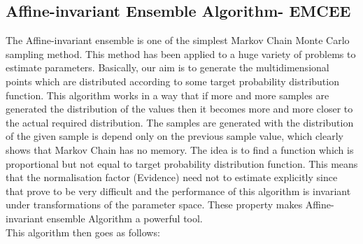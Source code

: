 \documentclass[12pt]{report}
\begin{document}
\subsection{Affine-invariant Ensemble  Algorithm-  EMCEE}
The Affine-invariant ensemble\cite{df2013} is one of the simplest Markov Chain Monte Carlo sampling method. This method has been applied to a huge variety of problems to estimate parameters. Basically, our aim is to generate the multidimensional points which are distributed according to some target probability distribution function. This algorithm works in a way that if more and more samples are generated the distribution of the values then it becomes more and more closer to the actual required distribution. The samples are generated with the distribution of the given sample is depend only on the previous sample value, which clearly shows that Markov Chain  has no memory. The idea is to find a function which is proportional but not equal to target probability distribution function. This means that the normalisation factor (Evidence) need not to estimate explicitly since that prove to be very difficult and the performance of this algorithm is invariant under transformations of the parameter space. These property makes Affine-invariant ensemble Algorithm a powerful tool. \\
This algorithm then goes as follows: 
\end{document}
